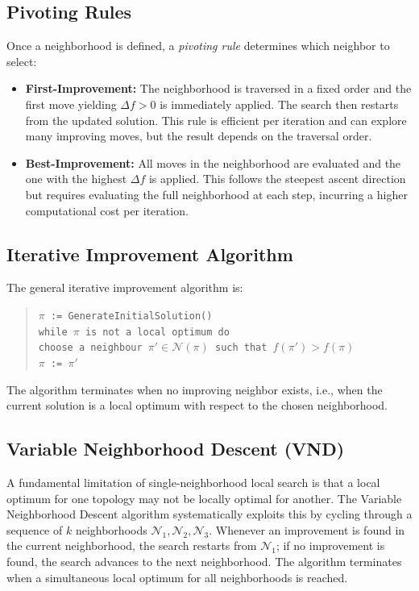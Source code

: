 \documentclass[11pt, a4paper]{article}
\begin{document}
\subsection{Pivoting Rules}

Once a neighborhood is defined, a \emph{pivoting rule} determines which neighbor to select:

\begin{itemize}
    \item \textbf{First-Improvement:} The neighborhood is traversed in a fixed order and the first move yielding $\Delta f > 0$ is immediately applied. The search then restarts from the updated solution. This rule is efficient per iteration and can explore many improving moves, but the result depends on the traversal order.
    \item \textbf{Best-Improvement:} All moves in the neighborhood are evaluated and the one with the highest $\Delta f$ is applied. This follows the steepest ascent direction but requires evaluating the full neighborhood at each step, incurring a higher computational cost per iteration.
\end{itemize}

\subsection{Iterative Improvement Algorithm}

The general iterative improvement algorithm is:

\begin{quote}
\texttt{$\pi$ := GenerateInitialSolution()}\\
\texttt{while $\pi$ is not a local optimum do}\\
\quad \texttt{choose a neighbour $\pi' \in \mathcal{N}(\pi)$ such that $f(\pi') > f(\pi)$}\\
\quad \texttt{$\pi$ := $\pi'$}
\end{quote}

The algorithm terminates when no improving neighbor exists, i.e., when the current solution is a local optimum with respect to the chosen neighborhood.

\subsection{Variable Neighborhood Descent (VND)}

A fundamental limitation of single-neighborhood local search is that a local optimum for one topology may not be locally optimal for another. The Variable Neighborhood Descent algorithm systematically exploits this by cycling through a sequence of $k$ neighborhoods $\mathcal{N}_1, \mathcal{N}_2, \mathcal{N}_3$. Whenever an improvement is found in the current neighborhood, the search restarts from $\mathcal{N}_1$; if no improvement is found, the search advances to the next neighborhood. The algorithm terminates when a simultaneous local optimum for all neighborhoods is reached.
\end{document}
